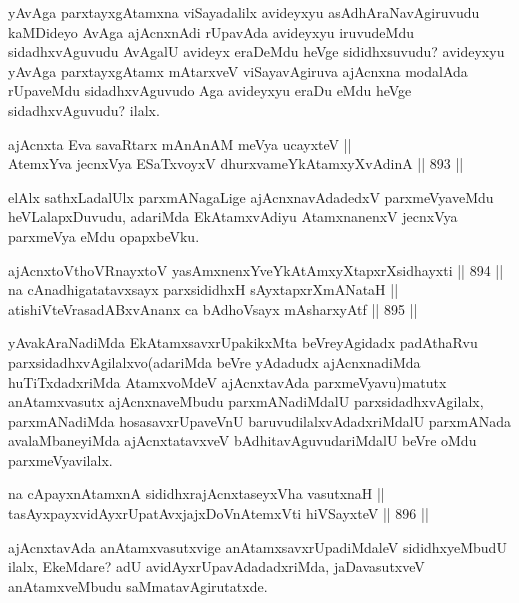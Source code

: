 \begin{artha}
yAvAga parxtayxgAtamxna viSayadalilx avideyxyu asAdhAraNavAgiruvudu kaMDideyo AvAga ajAcnxnAdi rUpavAda avideyxyu iruvudeMdu sidadhxvAguvudu AvAgalU avideyx eraDeMdu heVge sididhxsuvudu? avideyxyu yAvAga parxtayxgAtamx mAtarxveV viSayavAgiruva ajAcnxna modalAda rUpaveMdu sidadhxvAguvudo Aga avideyxyu eraDu eMdu heVge sidadhxvAguvudu? ilalx.
\end{artha}

\begin{shl}
ajAcnxta Eva savaRtarx mAnAnAM meVya ucayxteV || \\
AtemxYva jecnxVya ESaTxvoyxV dhurxvameYkAtamxyXvAdinA \hfill || 893 ||  
\end{shl}

\begin{artha}
elAlx sathxLadalUlx parxmANagaLige ajAcnxnavAdadedxV parxmeVyaveMdu heVLalapxDuvudu, adariMda EkAtamxvAdiyu AtamxnanenxV jecnxVya parxmeVya eMdu opapxbeVku.
\end{artha}

\begin{shl}
ajAcnxtoV\s thoVR\s nayxtoV yasAmxnenxYveYkAtAmxyXtapxrXsidhayxti \hfill || 894 ||  \\
na cAnadhigatatavxsayx parxsididhxH sAyxtapxrXmANataH || \\
atishiVteVrasadABxvAnanx ca bAdhoV\s sayx mAsharxyAtf \hfill || 895 ||  
\end{shl}

\begin{artha}
yAvakAraNadiMda EkAtamxsavxrUpakikxMta beVreyAgidadx padAthaRvu parxsidadhxvAgilalxvo(adariMda beVre yAdadudx ajAcnxnadiMda huTiTxdadxriMda AtamxvoMdeV ajAcnxtavAda parxmeVyavu)matutx anAtamxvasutx ajAcnxnaveMbudu parxmANadiMdalU parxsidadhxvAgilalx, parxmANadiMda hosasavxrUpaveVnU baruvudilalxvAdadxriMdalU parxmANada avalaMbaneyiMda ajAcnxtatavxveV bAdhitavAguvudariMdalU beVre oMdu parxmeVyavilalx.
\end{artha}

\begin{shl}
na cApayxnAtamxnA sididhxrajAcnxtaseyxVha vasutxnaH || \\
tasAyxpayxvidAyxrUpatAvxjajxDoV\s nAtemxVti hiVSayxteV \hfill || 896 ||  
\end{shl}

\begin{artha}
ajAcnxtavAda anAtamxvasutxvige anAtamxsavxrUpadiMdaleV sididhxyeMbudU ilalx, EkeMdare? adU avidAyxrUpavAdadadxriMda, jaDavasutxveV anAtamxveMbudu saMmatavAgirutatxde.
\end{artha}


